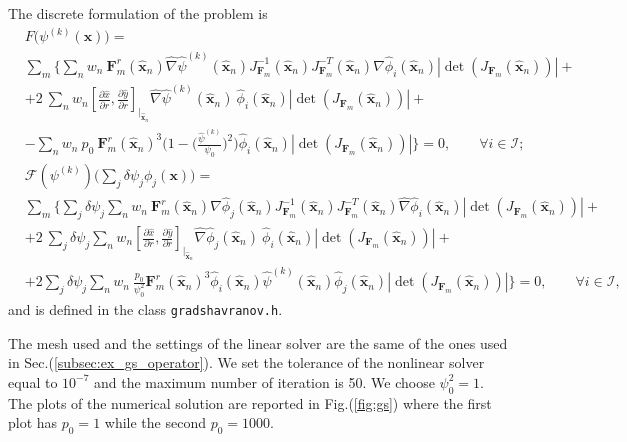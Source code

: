 The discrete formulation of the problem is
\begin{equation}
  \begin{split}
    &F\big(\psi^{(k)}(\mathbf{x})\big)=\\
    &\sum_m \bigg\{\sum_n w_n\:\mathbf{F}_m^r(\mathbf{\hat{x}}_n)\hat{\nabla}\hat{\psi}^{(k)}(\mathbf{\hat{x}}_n)J_{\mathbf{F}_m}^{-1}(\mathbf{\hat{x}}_n)J_{\mathbf{F}_m}^{-T}(\mathbf{\hat{x}}_n)\hat{\nabla}\hat{\phi}_i(\mathbf{\hat{x}}_n)|\det(J_{\mathbf{F}_m}(\mathbf{\hat{x}}_n))| +\\
    &+2\:\sum_n w_n[\frac{\partial\hat{x}}{\partial r},\frac{\partial\hat{y}}{\partial r}]_{\big|_{\mathbf{\hat{x}}_n}}\hat{\nabla} \hat{\psi}^{(k)}(\mathbf{\hat{x}}_n)\:\hat{\phi}_i(\mathbf{\hat{x}}_n)|\det(J_{\mathbf{F}_m}(\mathbf{\hat{x}}_n))|+\\
    &-\sum_n w_n\:p_0\:\mathbf{F}_m^r(\mathbf{\hat{x}}_n)^3 \bigg(1-\bigg(\frac{\hat{\psi}^{(k)}}{\psi_0}\bigg)^2\bigg)\hat{\phi}_i(\mathbf{\hat{x}}_n)|\det(J_{\mathbf{F}_m}(\mathbf{\hat{x}}_n))|\bigg\}=0, \qquad\forall i\in\mathcal{I};
  \end{split}
\end{equation}
\begin{equation}
  \begin{split}
    &\mathcal{F}(\psi^{(k)})\bigg(\sum_j\delta \psi_j\phi_j(\mathbf{x})\bigg)=\\
    &\sum_m \bigg\{\sum_j \delta\psi_j \sum_n w_n\:\mathbf{F}_m^r(\mathbf{\hat{x}}_n)\hat{\nabla}\hat{\phi}_j(\mathbf{\hat{x}}_n)J_{\mathbf{F}_m}^{-1}(\mathbf{\hat{x}}_n)J_{\mathbf{F}_m}^{-T}(\mathbf{\hat{x}}_n)\hat{\nabla}\hat{\phi}_i(\mathbf{\hat{x}}_n)|\det(J_{\mathbf{F}_m}(\mathbf{\hat{x}}_n))| +\\
    &+2\:\sum_j\delta\psi_j\sum_n w_n[\frac{\partial\hat{x}}{\partial r},\frac{\partial\hat{y}}{\partial r}]_{\big|_{\mathbf{\hat{x}}_n}}\hat{\nabla} \hat{\phi}_j(\mathbf{\hat{x}}_n)\:\hat{\phi}_i(\mathbf{\hat{x}}_n)|\det(J_{\mathbf{F}_m}(\mathbf{\hat{x}}_n))|+\\
    &+2\sum_j\delta\psi_j\sum_n w_n\:\frac{p_0}{\psi_0^2}\mathbf{F}_m^r(\mathbf{\hat{x}}_n)^3\hat{\phi}_i(\mathbf{\hat{x}}_n)\hat{\psi}^{(k)}(\mathbf{\hat{x}}_n)\hat{\phi}_j(\mathbf{\hat{x}}_n)|\det(J_{\mathbf{F}_m}(\mathbf{\hat{x}}_n))|\bigg\}=0, \qquad\forall i\in\mathcal{I},
  \end{split}
\end{equation}
and is defined in the class \verb|gradshavranov.h|.
\medskip

The mesh used and the settings of the linear solver are the same of the ones used in Sec.(\ref{subsec:ex_gs_operator}). We set the tolerance of the nonlinear solver equal to $10^{-7}$ and the maximum number of iteration is 50. We choose $\psi^2_0=1$. The plots of the numerical solution are reported in Fig.(\ref{fig:gs}) where the first plot has $p_0=1$ while the second $p_0=1000$.

